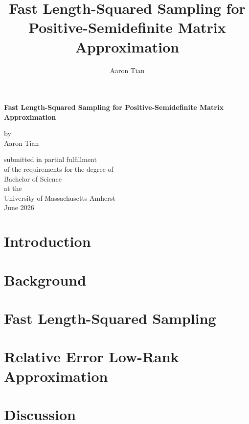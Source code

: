 \documentclass[12pt,reqno]{memoir}
\title{Fast Length-Squared Sampling for Positive-Semidefinite Matrix Approximation}
\author{Aaron Tian}
\date{}
\begin{document}
\begin{titlingpage}
\centering
\vspace*{1.5in}

{\LARGE\bfseries
Fast Length-Squared Sampling for Positive-Semidefinite Matrix Approximation
\par}

\vspace{1.25in}

{\large by\\Aaron Tian\par}

\vfill

{\large
submitted in partial fulfillment\\
of the requirements for the degree of\\
Bachelor of Science\\
at the\\
University of Massachusetts Amherst\\
June 2026
\par}

\vspace*{1.5in}
\end{titlingpage}

\newpage

\newpage
\tableofcontents
\newpage
\DoubleSpacing
\chapter{Introduction}
\label{chapter:intro}


\chapter{Background}


\chapter{Fast Length-Squared Sampling}
\label{chapter:fast-sample}




\chapter{Relative Error Low-Rank Approximation}


\chapter{Discussion}

\newpage


\end{document}
